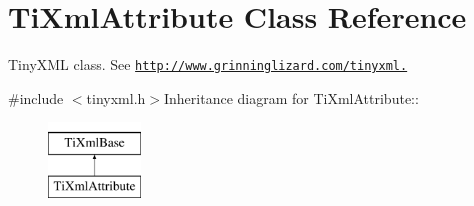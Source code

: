 \hypertarget{class_ti_xml_attribute}{
\section{TiXmlAttribute Class Reference}
\label{class_ti_xml_attribute}
}


TinyXML class. See \href{http://www.grinninglizard.com/tinyxml.}{\tt http://www.grinninglizard.com/tinyxml.}  


{\ttfamily \#include $<$tinyxml.h$>$}Inheritance diagram for TiXmlAttribute::\begin{figure}[H]
\begin{center}
\leavevmode
\includegraphics[height=2cm]{class_ti_xml_attribute}
\end{center}
\end{figure}
